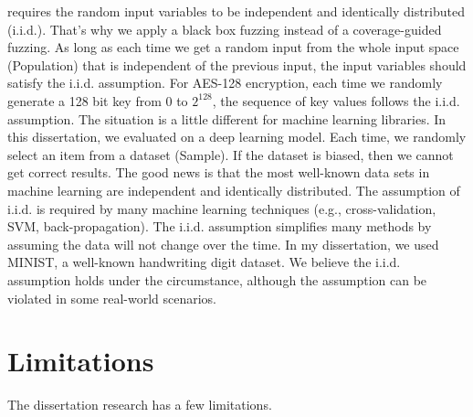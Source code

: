\ctool{} requires the random input variables to be independent and identically distributed (i.i.d.). That's why we apply a black box fuzzing instead of a coverage-guided fuzzing. As long as each time we get a random input from the whole input space (Population) that is independent of the previous input, the input variables should satisfy the i.i.d. assumption. For AES-128 encryption, each time we randomly generate a 128 bit key from $0$ to $2^{128}$, the sequence of key values follows the i.i.d. assumption. The situation is a little different for machine learning libraries. In this dissertation, we evaluated \ctool{} on a deep learning model. Each time, we randomly select an item from a dataset (Sample). If the dataset is biased, then we cannot get correct results. The good news is that the most well-known data sets in
machine learning are independent and identically distributed. The assumption of i.i.d. is required by many machine learning
techniques (e.g., cross-validation, SVM, back-propagation). The i.i.d. assumption
simplifies many methods by assuming the data will not change over the time. 
In my dissertation, we used MINIST, a well-known handwriting digit dataset. 
We believe the i.i.d. assumption holds under the circumstance, although the
assumption can be violated in some real-world scenarios.


\section{Limitations}
The dissertation research has a few limitations.

